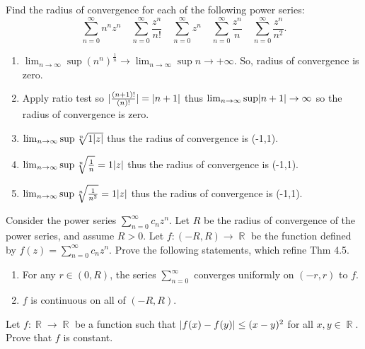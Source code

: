\documentclass[12pt,letterpaper,boxed]{hmcpset}
\DeclareMathOperator{\R}{\mathbb{R}}
\DeclarePairedDelimiter\abs{\lvert}{\rvert}%
\begin{document}
\begin{problem}[Exercise 4.6]
Find the radius of convergence for each of the following power series: $$
\sum_{n=0}^{\infty} n^{n} z^{n} \quad \sum_{n=0}^{\infty} \frac{z^{n}}{n !} \quad \sum_{n=0}^{\infty} z^{n} \quad \sum_{n=0}^{\infty} \frac{z^{n}}{n} \quad \sum_{n=0}^{\infty} \frac{z^{n}}{n^{2}}
.$$
\end{problem}

\begin{solution}
\begin{enumerate}
    \item $\lim_{n \rightarrow \infty}\sup (n^{n})^{\frac{1}{n}} \rightarrow \lim_{n \rightarrow \infty}\sup n\rightarrow +\infty$. So, radius of convergence is zero.
    \item Apply ratio test so $\abs{\frac{(n + 1)!}{(n)!}} = \abs{n + 1}$ thus $\lim_{n \rightarrow \infty}\sup \abs{n + 1} \rightarrow \infty$ so the radius of convergence is zero. 
    \item $\lim_{n \rightarrow \infty}\sup \sqrt[n]{1\abs{z}}$ thus the radius of convergence is (-1,1).
    \item $\lim_{n \rightarrow \infty}\sup \sqrt[n]{\frac{1}{n}} = 1\abs{z}$ thus the radius of convergence is (-1,1).
    \item $\lim_{n \rightarrow \infty}\sup \sqrt[n]{\frac{1}{n^{2}}} = 1\abs{z}$ thus the radius of convergence is (-1,1).
\end{enumerate}
\end{solution}


\begin{problem}[Exercise 4.7]
Consider the power series $\sum_{n=0}^{\infty} c_nz^{n}$. Let $R$ be the radius of convergence of the power series, and assume $R>0$. Let $f: (-R,R) \rightarrow \R$ be the function defined by $f(z)=\sum_{n=0}^{\infty} c_nz^{n}$. Prove the following statements, which refine Thm 4.5.
\begin{enumerate}
    \item For any $r \in (0, R)$, the series $\sum_{n=0}^{\infty}$ converges uniformly on $(-r, r)$ to $f$.
    \item $f$ is continuous on all of $(-R,R)$.
\end{enumerate}
\end{problem}


\begin{solution}
\end{solution}


\begin{problem}[Exercise 1.5]
Let $f: \R \rightarrow \R$ be a function such that $\abs{f(x) - f(y)} \leq (x - y)^{2}$ for all $x, y \in \R.$ Prove that $f$ is constant.
\end{problem}
\end{document}
